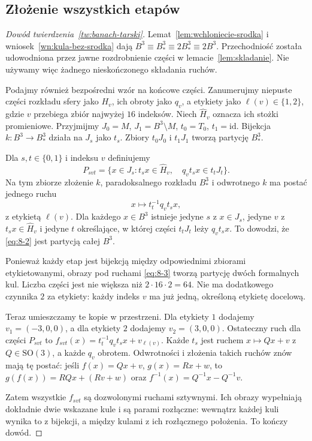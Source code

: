 \documentclass[11pt,a4paper]{article}
\numberwithin{equation}{section}
\theoremstyle{plain}
\theoremstyle{definition}
\theoremstyle{remark}
\newcommand{\id}{\mathrm{id}}
\begin{document}
\subsection{Złożenie wszystkich etapów}
\begin{proof}[Dowód twierdzenia~\ref{tw:banach-tarski}]
Lemat~\ref{lem:wchloniecie-srodka} i wniosek~\ref{wn:kula-bez-srodka} dają $B^3\equiv B^3_*\equiv2B^3_*\equiv2B^3$. Przechodniość została udowodniona przez jawne rozdrobnienie części w lemacie~\ref{lem:skladanie}. Nie używamy więc żadnego nieskończonego składania ruchów.

Podajmy również bezpośredni wzór na końcowe części. Zanumerujmy niepuste części rozkładu sfery jako $H_v$, ich obroty jako $q_v$, a etykiety jako $\ell(v)\in\{1,2\}$, gdzie $v$ przebiega zbiór najwyżej $16$ indeksów. Niech $\widehat H_v$ oznacza ich stożki promieniowe. Przyjmijmy $J_0=M$, $J_1=B^3\setminus M$, $t_0=T_0$, $t_1=\id$. Bijekcja $k:B^3\to B^3_*$ działa na $J_s$ jako $t_s$. Zbiory $t_0J_0$ i $t_1J_1$ tworzą partycję $B^3_*$.

Dla $s,t\in\{0,1\}$ i indeksu $v$ definiujemy
\begin{equation}\label{eq:8-2}
 P_{svt}=\{x\in J_s:t_sx\in\widehat H_v,\quad q_vt_sx\in t_tJ_t\}.
\end{equation}
Na tym zbiorze złożenie $k$, paradoksalnego rozkładu $B^3_*$ i odwrotnego $k$ ma postać jednego ruchu
\begin{equation}\label{eq:8-3}
 x\longmapsto t_t^{-1}q_vt_sx,
\end{equation}
z etykietą $\ell(v)$. Dla każdego $x\in B^3$ istnieje jedyne $s$ z $x\in J_s$, jedyne $v$ z $t_sx\in\widehat H_v$ i jedyne $t$ określające, w której części $t_tJ_t$ leży $q_vt_sx$. To dowodzi, że \eqref{eq:8-2} jest partycją całej $B^3$.

Ponieważ każdy etap jest bijekcją między odpowiednimi zbiorami etykietowanymi, obrazy pod ruchami \eqref{eq:8-3} tworzą partycję dwóch formalnych kul. Liczba części jest nie większa niż $2\cdot16\cdot2=64$. Nie ma dodatkowego czynnika $2$ za etykiety: każdy indeks $v$ ma już jedną, określoną etykietę docelową.

Teraz umieszczamy te kopie w przestrzeni. Dla etykiety $1$ dodajemy $v_1=(-3,0,0)$, a dla etykiety $2$ dodajemy $v_2=(3,0,0)$. Ostateczny ruch dla części $P_{svt}$ to $f_{svt}(x)=t_t^{-1}q_vt_sx+v_{\ell(v)}$. Każde $t_s$ jest ruchem $x\mapsto Qx+v$ z $Q\in\mathrm{SO}(3)$, a każde $q_v$ obrotem. Odwrotności i złożenia takich ruchów znów mają tę postać: jeśli $f(x)=Qx+v$, $g(x)=Rx+w$, to $g(f(x))=RQx+(Rv+w)$ oraz $f^{-1}(x)=Q^{-1}x-Q^{-1}v$.

Zatem wszystkie $f_{svt}$ są dozwolonymi ruchami sztywnymi. Ich obrazy wypełniają dokładnie dwie wskazane kule i są parami rozłączne: wewnątrz każdej kuli wynika to z bijekcji, a między kulami z ich rozłącznego położenia. To kończy dowód.
\end{proof}
\end{document}

